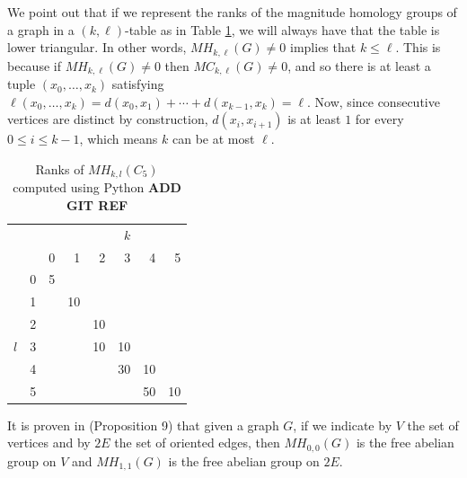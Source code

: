 \documentclass[runningheads]{llncs}
\begin{document}
\begin{remark}
\label{LowerTriangRem}
We point out that if we represent the ranks of the magnitude homology groups of a graph in a $(k,\ell)$-table as in Table \ref{TableC5}, we will always have that the table is lower triangular.
In other words, $MH_{k,\ell}(G)\neq 0$ implies that $k \leq \ell$.
This is because if $MH_{k,\ell}(G)\neq 0$ then $MC_{k,\ell}(G)\neq 0$, and so there is at least a tuple $(x_0,\dots,x_k)$ satisfying $\ell(x_0,\dots,x_k)=d(x_0,x_1)+\cdots+d(x_{k-1},x_k) = \ell$.
Now, since consecutive vertices are distinct by construction, $d(x_i,x_{i+1})$ is at least $1$ for every $0\leq i\leq k-1$, which means $k$ can be at most $\ell$.

\begin{table}
\begin{center}
\quad
\begin{tabular}{rr|rrrrrr}
&&&&&$k$\\
&&0&1&2&3&4&5\\ 
\hline                                                               
   & 0 &5\\
   & 1 & &10\\                                          
   & 2 & & &10\\                                          
$l$& 3 & & &10 &10\\                                          
   & 4 & & &   &30 &10\\                                         
   & 5 & & &   &   &50 &10\\           
\end{tabular}
\end{center}
\caption{Ranks of $MH_{k,l}(C_5)$ computed using Python \textbf{ADD GIT REF}}
\label{TableC5}
\end{table}

\end{remark}

It is proven in \cite{hepworth2015categorifying} (Proposition 9) that given a graph $G$, if we indicate by $V$ the set of vertices and by $2E$ the set of oriented edges, then $MH_{0,0}(G)$ is the free abelian group on $V$ and $MH_{1,1}(G)$ is the free abelian group on $2E$.
\end{document}
